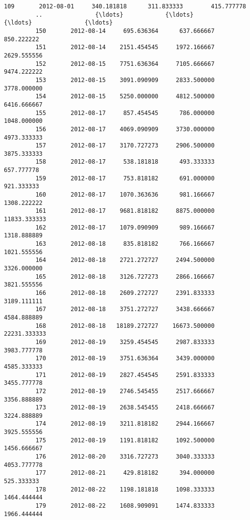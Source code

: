 \documentclass[11pt]{article}
\begin{document}
\begin{Verbatim}[commandchars=\\\{\}]
         109       2012-08-01     340.181818      311.833333        415.777778   
         ..               {\ldots}            {\ldots}             {\ldots}               {\ldots}   
         150       2012-08-14     695.636364      637.666667        850.222222   
         151       2012-08-14    2151.454545     1972.166667       2629.555556   
         152       2012-08-15    7751.636364     7105.666667       9474.222222   
         153       2012-08-15    3091.090909     2833.500000       3778.000000   
         154       2012-08-15    5250.000000     4812.500000       6416.666667   
         155       2012-08-17     857.454545      786.000000       1048.000000   
         156       2012-08-17    4069.090909     3730.000000       4973.333333   
         157       2012-08-17    3170.727273     2906.500000       3875.333333   
         158       2012-08-17     538.181818      493.333333        657.777778   
         159       2012-08-17     753.818182      691.000000        921.333333   
         160       2012-08-17    1070.363636      981.166667       1308.222222   
         161       2012-08-17    9681.818182     8875.000000      11833.333333   
         162       2012-08-17    1079.090909      989.166667       1318.888889   
         163       2012-08-18     835.818182      766.166667       1021.555556   
         164       2012-08-18    2721.272727     2494.500000       3326.000000   
         165       2012-08-18    3126.727273     2866.166667       3821.555556   
         166       2012-08-18    2609.272727     2391.833333       3189.111111   
         167       2012-08-18    3751.272727     3438.666667       4584.888889   
         168       2012-08-18   18189.272727    16673.500000      22231.333333   
         169       2012-08-19    3259.454545     2987.833333       3983.777778   
         170       2012-08-19    3751.636364     3439.000000       4585.333333   
         171       2012-08-19    2827.454545     2591.833333       3455.777778   
         172       2012-08-19    2746.545455     2517.666667       3356.888889   
         173       2012-08-19    2638.545455     2418.666667       3224.888889   
         174       2012-08-19    3211.818182     2944.166667       3925.555556   
         175       2012-08-19    1191.818182     1092.500000       1456.666667   
         176       2012-08-20    3316.727273     3040.333333       4053.777778   
         177       2012-08-21     429.818182      394.000000        525.333333   
         178       2012-08-22    1198.181818     1098.333333       1464.444444   
         179       2012-08-22    1608.909091     1474.833333       1966.444444   
         

\end{Verbatim}
\end{document}
